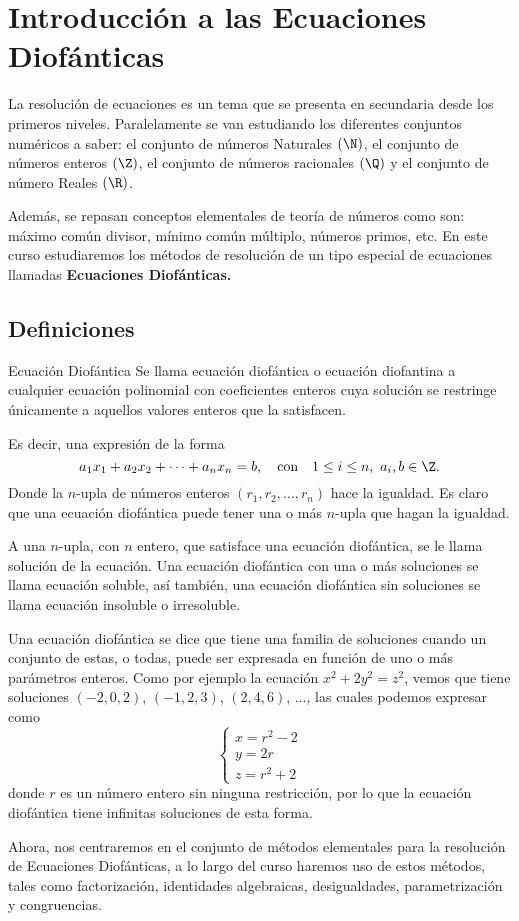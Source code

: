 \section{Introducción a las Ecuaciones Diofánticas}

La resolución de ecuaciones es un tema que se presenta en secundaria desde los primeros niveles.
Paralelamente se van estudiando los diferentes conjuntos numéricos a saber: el conjunto de números Naturales $(\N)$,
el conjunto de números enteros $(\Z)$, el conjunto de números racionales $(\Q)$ y el conjunto de número Reales $(\R)$.

Además, se repasan conceptos elementales de teoría de números como son: máximo común divisor, mínimo común múltiplo, números primos, etc.
En este curso estudiaremos los métodos de resolución de un tipo especial de ecuaciones llamadas \textbf{Ecuaciones Diofánticas.}

\subsection{Definiciones}

\begin{definition.box}{Ecuación Diofántica}{}
    Se llama {ecuación diofántica} o {ecuación diofantina} a cualquier ecuación polinomial con coeficientes enteros cuya
    solución se restringe únicamente a aquellos valores enteros que la satisfacen.
\end{definition.box}

Es decir, una expresión de la forma
\[
    a_1 x_1 + a_2 x_2 + \cdots + a_n x_n = b, \quad \text{con} \quad 1 \leq i \leq n,\ a_i, b \in \Z.
\]
Donde la $n$-upla de números enteros $(r_1, r_2, \ldots, r_n)$ hace la igualdad.
Es claro que una ecuación diofántica puede tener una o más $n$-upla que hagan la igualdad.

\begin{definition.box}{}{}
    A una $n$-upla, con $n$ entero, que satisface una ecuación diofántica, se le llama {solución} de la ecuación.
    Una ecuación diofántica con una o más soluciones se llama ecuación {soluble}, así también, una ecuación diofántica sin
    soluciones se llama ecuación {insoluble} o {irresoluble}.
\end{definition.box}

Una ecuación diofántica se dice que tiene una familia de soluciones cuando un conjunto de estas, o todas, puede ser expresada en función de uno o más parámetros enteros.
Como por ejemplo la ecuación $x^2 + 2y^2 = z^2$, vemos que tiene soluciones $(-2, 0, 2)$, $(-1, 2, 3)$, $(2, 4, 6)$, $\ldots$, las cuales podemos expresar como
\[
    \begin{cases}
        x = r^2 - 2\\
        y = 2r\\
        z = r^2 + 2
    \end{cases}
\]
donde $r$ es un número entero sin ninguna restricción, por lo que la ecuación diofántica tiene infinitas soluciones de esta forma.

Ahora, nos centraremos en el conjunto de métodos elementales para la resolución de Ecuaciones Diofánticas, a lo largo del curso
haremos uso de estos métodos, tales como factorización, identidades algebraicas, desigualdades, parametrización y congruencias.